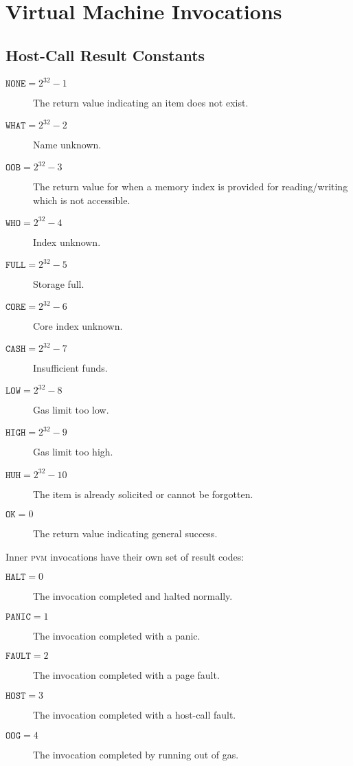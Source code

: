 \section{Virtual Machine Invocations}\label{sec:virtualmachineinvocations}



\newcommand*{\pvm}{\mathbf{M}}
\newcommand*{\segoff}{\varsigma}

\subsection{Host-Call Result Constants}

\begin{description}
  \item[$\mathtt{NONE} = 2^{32} - 1$] The return value indicating an item does not exist.
  \item[$\mathtt{WHAT} = 2^{32} - 2$] Name unknown.
  \item[$\mathtt{OOB} = 2^{32} - 3$] The return value for when a memory index is provided for reading/writing which is not accessible.
  \item[$\mathtt{WHO} = 2^{32} - 4$] Index unknown.
  \item[$\mathtt{FULL} = 2^{32} - 5$] Storage full.
  \item[$\mathtt{CORE} = 2^{32} - 6$] Core index unknown.
  \item[$\mathtt{CASH} = 2^{32} - 7$] Insufficient funds.
  \item[$\mathtt{LOW} = 2^{32} - 8$] Gas limit too low.
  \item[$\mathtt{HIGH} = 2^{32} - 9$] Gas limit too high.
  \item[$\mathtt{HUH} = 2^{32} - 10$] The item is already solicited or cannot be forgotten.
  \item[$\mathtt{OK} = 0$] The return value indicating general success.
\end{description}

Inner \textsc{pvm} invocations have their own set of result codes:
\begin{description}
  \item[$\mathtt{HALT} = 0$] The invocation completed and halted normally.
  \item[$\mathtt{PANIC} = 1$] The invocation completed with a panic.
  \item[$\mathtt{FAULT} = 2$] The invocation completed with a page fault.
  \item[$\mathtt{HOST} = 3$] The invocation completed with a host-call fault.
  \item[$\mathtt{OOG} = 4$] The invocation completed by running out of gas.
\end{description}

